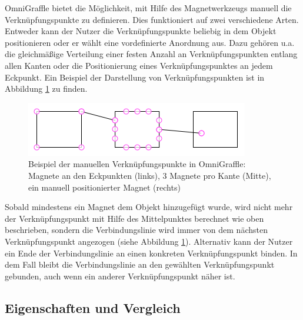 OmniGraffle bietet die Möglichkeit, mit Hilfe des Magnetwerkzeugs manuell die Verknüpfungspunkte zu definieren. Dies funktioniert auf zwei verschiedene Arten. Entweder kann der Nutzer die Verknüpfungspunkte beliebig in dem Objekt positionieren oder er wählt eine vordefinierte Anordnung aus. Dazu gehören u.a. die gleichmäßige Verteilung einer festen Anzahl an Verknüpfungspunkten entlang allen Kanten oder die Positionierung eines Verknüpfungspunktes an jedem Eckpunkt. Ein Beispiel der Darstellung von Verknüpfungspunkten ist in Abbildung \ref{fig:omnigraffle-magnets-example} zu finden.

\begin{figure}[hbt]
    \centering
    \includegraphics{resources/omnigraffle-magnets-example.png}
    \caption{Beispiel der manuellen Verknüpfungspunkte in OmniGraffle: Magnete an den Eckpunkten (links), 3 Magnete pro Kante (Mitte), ein manuell positionierter Magnet (rechts)}
    \label{fig:omnigraffle-magnets-example}
\end{figure}

Sobald mindestens ein Magnet dem Objekt hinzugefügt wurde, wird nicht mehr der Verknüpfungspunkt mit Hilfe des Mittelpunktes berechnet wie oben beschrieben, sondern die Verbindungslinie wird immer von dem nächsten Verknüpfungspunkt angezogen (siehe Abbildung \ref{fig:omnigraffle-magnets-example}). Alternativ kann der Nutzer ein Ende der Verbindungslinie an einen konkreten Verknüpfungspunkt binden. In dem Fall bleibt die Verbindungslinie an den gewählten Verknüpfungspunkt gebunden, auch wenn ein anderer Verknüpfungspunkt näher ist.

\subsection{Eigenschaften und Vergleich}


